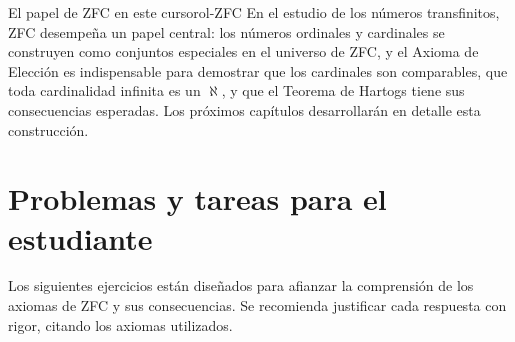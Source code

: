 \begin{observacion}{El papel de ZFC en este curso}{rol-ZFC}
En el estudio de los números transfinitos, ZFC desempeña un papel central: los números ordinales y cardinales se construyen como conjuntos especiales en el universo de ZFC, y el Axioma de Elección es indispensable para demostrar que los cardinales son comparables, que toda cardinalidad infinita es un $\aleph$, y que el Teorema de Hartogs tiene sus consecuencias esperadas. Los próximos capítulos desarrollarán en detalle esta construcción.
\end{observacion}

\section{Problemas y tareas para el estudiante}

Los siguientes ejercicios están diseñados para afianzar la comprensión de los axiomas de ZFC y sus consecuencias. Se recomienda justificar cada respuesta con rigor, citando los axiomas utilizados.

